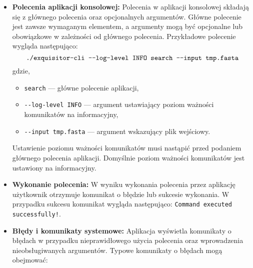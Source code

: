                 \begin{itemize}
                
                    \item{
                        \textbf{Polecenia aplikacji konsolowej:}
                        Polecenia w aplikacji konsolowej składają się z głównego polecenia oraz opcjonalnych argumentów. Główne polecenie jest zawsze wymaganym elementem, a argumenty mogą być opcjonalne lub obowiązkowe w zależności od głównego polecenia.
                        Przykładowe polecenie wygląda następująco:
                        \[
                            \texttt{./exquisitor-cli -\phantom{}-log-level INFO search -\phantom{}-input tmp.fasta}
                        \]
                        gdzie,
                        \begin{itemize}
                            \item {
                                \texttt{search} — główne polecenie aplikacji,
                            }
                            \item {
                                \texttt{-\phantom{}-log-level INFO} — argument ustawiający poziom ważności komunikatów na informacyjny,
                            }
                            \item {
                                \texttt{-\phantom{}-input tmp.fasta} — argument wskazujący plik wejściowy.
                            }
                        \end{itemize}
                        Ustawienie poziomu ważności komunikatów musi nastąpić przed podaniem głównego polecenia aplikacji. Domyślnie poziom ważności komunikatów jest ustawiony na informacyjny.
                    }
                    \item {
                        \textbf{Wykonanie polecenia:}
                        W wyniku wykonania polecenia przez aplikację użytkownik otrzymuje komunikat o błędzie lub sukcesie wykonania. W przypadku sukcesu komunikat wygląda następująco:
                        \texttt{Command executed successfully!}.
                    }
                    \item {
                        \textbf{Błędy i komunikaty systemowe:}
                        Aplikacja wyświetla komunikaty o błędach w przypadku nieprawidłowego użycia polecenia oraz wprowadzenia nieobsługiwanych argumentów. Typowe komunikaty o błędach mogą obejmować:
                        \begin{itemize}

\end{itemize}}
\end{itemize}
